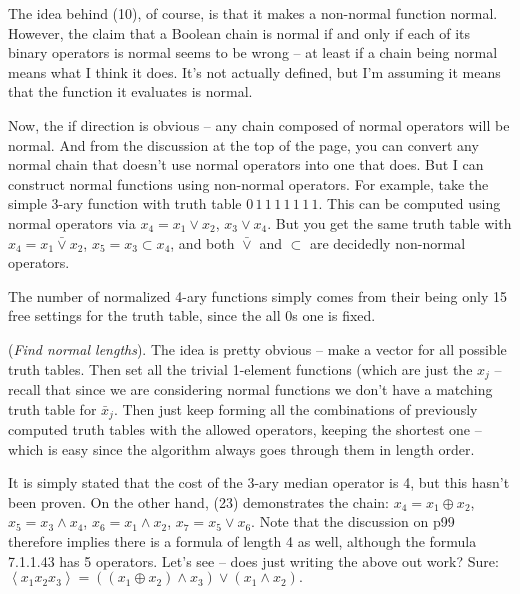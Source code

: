 \vskip 0.05in  The idea behind (10),
of course, is that it makes a non-normal function normal.  However, the claim
that a Boolean chain is normal if and only if each of its binary operators is
normal seems to be wrong -- at least if a chain being normal means what
I think it does.  It's not actually defined, but I'm assuming it means that the
function it evaluates is normal.  

Now, the if direction is obvious -- any chain composed of normal operators
will be normal.  And from the discussion at the top of the page, you can convert
any normal chain that doesn't use normal operators into one that does.
But I can construct normal functions using non-normal operators.
For example, take the simple 3-ary function with truth table
$0\,1\,1\,1\,1\,1\,1\,1$.  This can be computed using normal
operators via $x_4 = x_1 \lor x_2$, $x_3 \lor x_4$.  But you get
the same truth table with $x_4 = x_1 \bar \lor x_2$, $x_5 = x_3 \subset x_4$,
and both $\bar \lor$ and $\subset$ are decidedly non-normal operators.

The number of normalized 4-ary functions simply comes from their being
only 15 free settings for the truth table, since the all 0s one is fixed.

\vskip 0.05in  ({\it Find normal lengths}).\hfil\break
The idea is pretty obvious -- make a vector for all possible truth tables.
Then set all the trivial 1-element functions (which are just the $x_j$ --
recall that since we are considering normal functions we don't have
a matching truth table for $\bar x_j$.  Then just keep forming all the
combinations of previously computed truth tables with the allowed operators,
keeping the shortest one -- which is easy since the algorithm always goes
through them in length order.

\vskip 0.1in 

\noindent [p 107] It is simply stated that the cost of the 3-ary median
operator is 4, but this hasn't been proven.  On the other hand, (23)
demonstrates the chain: $x_4 = x_1 \oplus x_2$, $x_5 = x_3 \land x_4$,
$x_6 = x_1 \land x_2$, $x_7 = x_5 \lor x_6$.  Note that the discussion
on p99 therefore implies there is a formula of length 4 as well, although
the formula 7.1.1.43 has 5 operators.  Let's see -- does just writing
the above out work?  Sure:
$
\left< x_1 x_2 x_3 \right> = \left(\left(x_1 \oplus x_2\right) \land x_3\right)
\lor \left(x_1 \land x_2\right).
$

